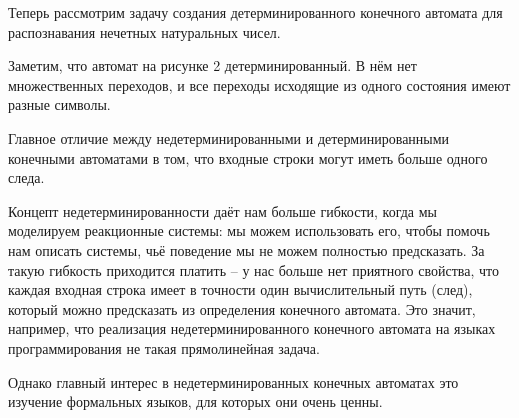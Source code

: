 Теперь рассмотрим задачу создания детерминированного конечного автомата для распознавания нечетных натуральных чисел. 


Заметим, что автомат на рисунке 2 детерминированный. В нём нет множественных переходов, и все переходы исходящие из одного состояния имеют разные символы.



Главное отличие между недетерминированными и детерминированными конечными автоматами в том, что входные строки могут иметь больше одного следа.

Концепт недетерминированности даёт нам больше гибкости, когда мы моделируем реакционные системы: мы можем использовать его, чтобы помочь нам описать системы, чьё поведение мы не можем полностью предсказать. За такую гибкость приходится платить -- у нас больше нет приятного свойства, что каждая входная строка имеет в точности один вычислительный путь (след), который можно предсказать из определения конечного автомата. Это значит, например, что реализация недетерминированного конечного автомата на языках программирования не такая прямолинейная задача. 

Однако главный интерес в недетерминированных конечных автоматах это изучение формальных языков, для которых они очень ценны. 

\label{def-ndfsm}


